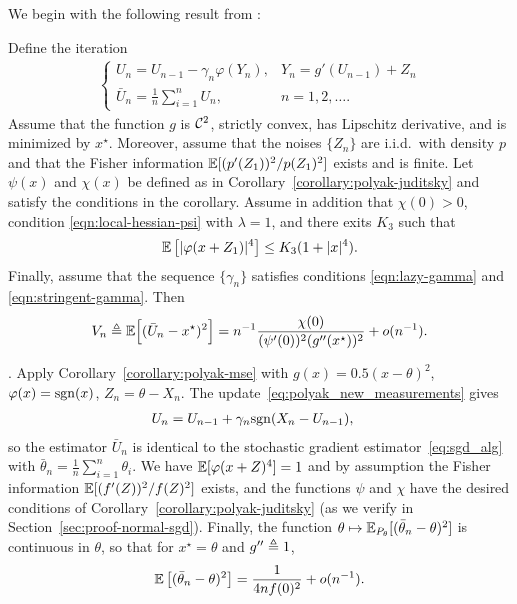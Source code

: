 We begin with the following result from \cite{polyak1990new}:
\begin{corollary}
  \label{corollary:polyak-mse}
  Define the iteration
  \begin{align} \label{eq:polyak_new_measurements}
    \begin{cases}
      U_n = U_{n-1} - \gamma_n \varphi(Y_n), & Y_n = g'(U_{n-1})+Z_n \\
      \bar{U}_n= \frac{1}{n} \sum_{i=1}^n U_n, & n=1,2,\ldots.
    \end{cases}
  \end{align}
  Assume that the function $g$ is $\mathcal{C}^2$, strictly convex, has Lipschitz
  derivative, and is minimized by $x^\star$. Moreover, assume that the
  noises $\{Z_n\}$ are i.i.d.\ with density $p$ and
  that the Fisher information $\mathbb{E}[(p'(Z_1))^2 / p(Z_1)^2]$ exists and is finite.
  Let $\psi(x)$ and $\chi(x)$ be defined as in
  Corollary~\ref{corollary:polyak-juditsky} and satisfy the conditions in
  the corollary. Assume in addition that $\chi(0)>0$, condition
  \eqref{eqn:local-hessian-psi} with $\lambda = 1$, and there exits $K_3$
  such that
  \begin{equation*}
    \mathbb{E}\left[   | \varphi(x+Z_1) |^4 \right] \leq K_3(1+|x|^4). 
  \end{equation*}
  Finally, assume that the sequence $\{\gamma_n \}$ satisfies conditions
  \eqref{eqn:lazy-gamma} and \eqref{eqn:stringent-gamma}. Then
  \begin{equation*}
    V_n \triangleq
    \mathbb{E}\Big[(\bar{U}_n-x^\star )^2\Big] = n^{-1}\frac{\chi(0)} {
      (\psi'(0))^2 (g''(x^\star))^2 } + o(n^{-1}).
  \end{equation*}
\end{corollary}

. Apply Corollary~\ref{corollary:polyak-mse} with $g(x) = 0.5(x-\theta)^2$,
$\varphi(x) = \mathrm{sgn}(x)$, $Z_n = \theta-X_n$.
The update~\eqref{eq:polyak_new_measurements} gives
\begin{align*} 
  U_n %
  & = U_{n-1} + \gamma_n \sgn(X_n-U_{n-1} ),
\end{align*}
so the estimator $\bar{U}_n$ is identical to the stochastic gradient
estimator~\eqref{eq:sgd_alg} with $\bar{\theta}_n = \frac{1}{n} \sum_{i =
  1}^n \theta_i$. We have $\mathbb{E}[\varphi(x + Z)^4] = 1$ and by assumption the
Fisher information $\mathbb{E}[(f'(Z))^2 / f(Z)^2]$ exists, and the functions $\psi$
and $\chi$ have the desired conditions of
Corollary~\ref{corollary:polyak-juditsky} (as we verify in
Section~\ref{sec:proof-normal-sgd}). Finally, the function $\theta \mapsto
\mathbb{E}_{P_\theta}[(\bar{\theta}_n - \theta)^2]$ is continuous in $\theta$, so
that for $x^\star = \theta$ and $g'' \triangleq 1$, 
\begin{align*}
\mathbb{E}\left[ (\bar{\theta}_n - \theta)^2\right] = \frac{1}{4nf(0)^2} + o(n^{-1}).
\end{align*}

